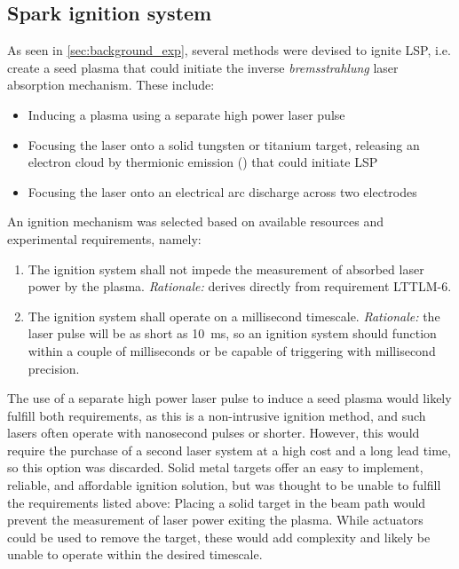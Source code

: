         \subsection{Spark ignition system}
            As seen in \autoref{sec:background_exp}, several methods were devised to ignite LSP, i.e. create a seed plasma that could initiate the inverse \emph{bremsstrahlung} laser absorption mechanism. These include:
            \begin{itemize}
                \item Inducing a plasma using a separate high power laser pulse
                \item Focusing the laser onto a solid tungsten or titanium target, releasing an electron cloud by thermionic emission (\textcite{schwartzLasersustainedGasPlasmas1989}) that could initiate LSP
                \item Focusing the laser onto an electrical arc discharge across two electrodes
            \end{itemize}
            An ignition mechanism was selected based on available resources and experimental requirements, namely:
            \begin{enumerate}
                \item The ignition system shall not impede the measurement of absorbed laser power by the plasma. \emph{Rationale:} derives directly from requirement LTTLM-6.
                \item The ignition system shall operate on a millisecond timescale. \emph{Rationale:} the laser pulse will be as short as 10~ms, so an ignition system should function within a couple of milliseconds or be capable of triggering with millisecond precision.
            \end{enumerate}
            The use of a separate high power laser pulse to induce a seed plasma would likely fulfill both requirements, as this is a non-intrusive ignition method, and such lasers often operate with nanosecond pulses or shorter. However, this would require the purchase of a second laser system at a high cost and a long lead time, so this option was discarded. Solid metal targets offer an easy to implement, reliable, and affordable ignition solution, but was thought to be unable to fulfill the requirements listed above: Placing a solid target in the beam path would prevent the measurement of laser power exiting the plasma. While actuators could be used to remove the target, these would add complexity and likely be unable to operate within the desired timescale.

